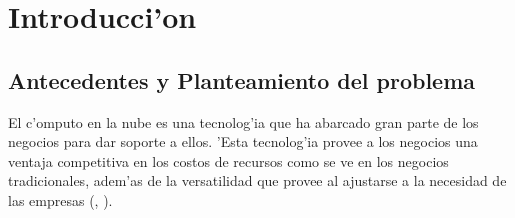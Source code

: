 



\chapter*{Introducci'on}

\section*{Antecedentes y Planteamiento del problema}


El c'omputo en la nube es una tecnolog'ia que ha abarcado gran parte de los negocios  para dar soporte a ellos. 'Esta tecnolog'ia provee a los negocios una ventaja competitiva en los costos de recursos como se ve en los negocios tradicionales, adem'as de la versatilidad que provee al ajustarse a la necesidad de las empresas (\citeauthor{srinivasan2014cloud}, \citeyear{srinivasan2014cloud}).




